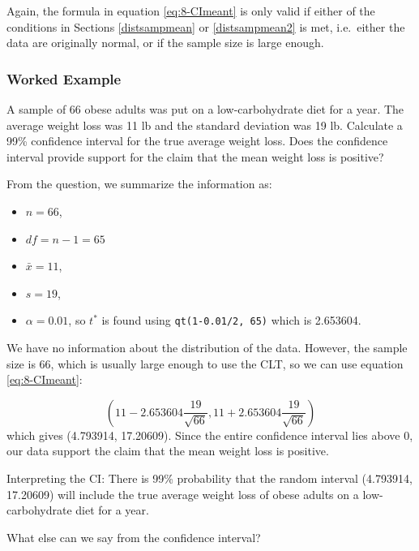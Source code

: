 \documentclass[
]{book}
\providecommand{\tightlist}{%
  \setlength{\itemsep}{0pt}\setlength{\parskip}{0pt}}
\theoremstyle{definition}
\theoremstyle{definition}
\theoremstyle{definition}
\theoremstyle{definition}
\theoremstyle{remark}
\begin{document}
Again, the formula in equation \eqref{eq:8-CImeant} is only valid if either of the conditions in Sections \ref{distsampmean} or \ref{distsampmean2} is met, i.e.~either the data are originally normal, or if the sample size is large enough.

\hypertarget{worked-example}{%
\subsubsection{Worked Example}\label{worked-example}}

A sample of 66 obese adults was put on a low-carbohydrate diet for a year. The average weight loss was 11 lb and the
standard deviation was 19 lb. Calculate a 99\% confidence interval for the true average weight loss. Does the confidence interval provide support for the claim that the mean weight loss is positive?

From the question, we summarize the information as:

\begin{itemize}
\tightlist
\item
  \(n = 66\),
\item
  \(df = n-1 = 65\)
\item
  \(\bar{x} = 11\),
\item
  \(s = 19\),
\item
  \(\alpha = 0.01\), so \(t^*\) is found using \texttt{qt(1-0.01/2,\ 65)} which is 2.653604.
\end{itemize}

We have no information about the distribution of the data. However, the sample size is 66, which is usually large enough to use the CLT, so we can use equation \eqref{eq:8-CImeant}:

\[
\left( 11 - 2.653604 \frac{19}{\sqrt{66}} , 11 + 2.653604 \frac{19}{\sqrt{66}} \right)
\]
which gives (4.793914, 17.20609). Since the entire confidence interval lies above 0, our data support the claim that the mean weight loss is positive.

Interpreting the CI: There is 99\% probability that the random interval (4.793914, 17.20609) will include the true average weight loss of obese adults on a low-carbohydrate diet for a year.

What else can we say from the confidence interval?
\end{document}
